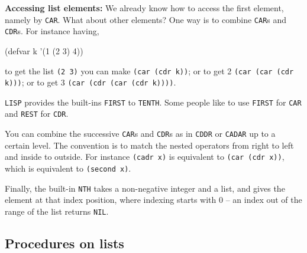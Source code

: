 \documentclass[a4paper,11pt]{article}
\begin{document}
\begin{uenum}
\item {\bf Accessing list elements:} We already know how to access the first element, namely by \Verb+CAR+. What about other elements? One way is to combine \Verb+CAR+s and \Verb+CDR+s. For instance having,

\begin{lispcode}
(defvar k '(1 (2 3) 4))
\end{lispcode}

to get the list \Verb+(2 3)+ you can make \Verb+(car (cdr k))+; or to get 2 \Verb+(car (car (cdr k)))+; or to get 3 \Verb+(car (cdr (car (cdr k))))+.

\Verb+LISP+ provides the built-ins \Verb+FIRST+ to \Verb+TENTH+. Some people like to use \Verb+FIRST+ for \Verb+CAR+ and \Verb+REST+ for \Verb+CDR+.

You can combine the successive \Verb+CAR+s and \Verb+CDR+s as in \Verb+CDDR+ or \Verb+CADAR+ up to a certain level. The convention is to match the nested operators from right to left and inside to outside. For instance \Verb+(cadr x)+ is equivalent to \Verb+(car (cdr x))+, which is equivalent to \Verb+(second x)+.

Finally, the built-in \Verb+NTH+ takes a non-negative integer and a list, and gives the element at that index position, where indexing starts with 0 -- an index out of the range of the list returns \Verb+NIL+. 

\end{uenum}

\subsection{Procedures on lists}
\end{document}
